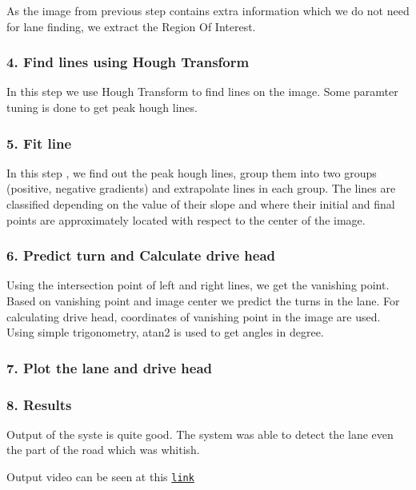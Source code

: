 As the image from previous step contains extra information which we do not need for lane finding, we extract the Region Of Interest.



\subsubsection*{4. Find lines using Hough Transform}

In this step we use Hough Transform to find lines on the image. Some paramter tuning is done to get peak hough lines.

\subsubsection*{5. Fit line}

In this step , we find out the peak hough lines, group them into two groups (positive, negative gradients) and extrapolate lines in each group. The lines are classified depending on the value of their slope and where their initial and final points are approximately located with respect to the center of the image.

\subsubsection*{6. Predict turn and Calculate drive head}

Using the intersection point of left and right lines, we get the vanishing point. Based on vanishing point and image center we predict the turns in the lane. For calculating drive head, coordinates of vanishing point in the image are used. Using simple trigonometry, atan2 is used to get angles in degree.

\subsubsection*{7. Plot the lane and drive head}



\subsubsection*{8. Results}

Output of the syste is quite good. The system was able to detect the lane even the part of the road which was whitish.



Output video can be seen at this \href{https://drive.google.com/drive/u/1/folders/1rqz6ssvReQMQbOU6W-9e-2ThTCKpCEad}{\tt link}

